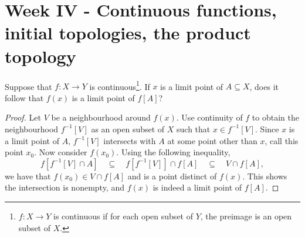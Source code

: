 \documentclass[../../main.tex]{subfiles}
\begin{document}
\section{Week IV - Continuous functions, initial topologies, the product topology}

\begin{problem}[1]
Suppose that $f : X \to Y$ is continuous\footnote{$f : X \to Y$ is continuous if for each open subset of $Y$, the preimage is an open subset of $X$.}.
If $x$ is a limit point of $A \subseteq X$, does it follow that $f(x)$ is a limit point of $f[A]$?
\end{problem}
\begin{proof}
	Let $V$ be a neighbourhood
	around $f(x)$.
	Use continuity of $f$ to obtain the neighbourhood $f^{-1}[V]$ as an open subset of $X$ such that $x \in f^{-1}[V]$.
	Since $x$ is a limit point of $A$, $f^{-1}[V]$ intersects with $A$ at some point other than $x$, call this point $x_0$.
	Now consider $f(x_0)$.
	Using the following inequality,
	\[
		f[f^{-1}[V] \cap A]
		\quad \subseteq \quad
		f[f^{-1}[V]] \cap f[A]
		\quad \subseteq \quad
		V \cap f[A],
	\]
	we have that $f(x_0) \in V \cap f[A]$ and is a point distinct of $f(x)$.
	This shows the intersection is nonempty, and $f(x)$ is indeed a limit point of $f[A]$.
\end{proof}
\end{document}
